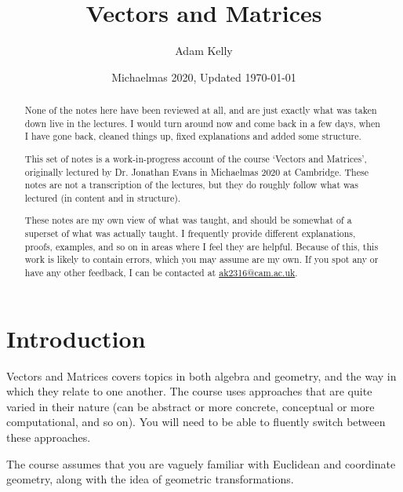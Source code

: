 \documentclass[a4]{scrartcl}
\title{Vectors and Matrices}
\author{Adam Kelly}
\date{Michaelmas 2020, Updated \today}
\begin{document}
\maketitle

\begin{abstract}\vspace{2\baselineskip}
	{\color{red} None of the notes here have been reviewed at all, and are just exactly what was taken down live in the lectures. I would turn around now and come back in a few days, when I have gone back, cleaned things up, fixed explanations and added some structure.}
	\vspace{5\baselineskip}



	This set of notes is a work-in-progress account of the course `Vectors and Matrices', originally lectured by Dr. Jonathan Evans in Michaelmas 2020 at Cambridge. These notes are not a transcription of the lectures, but they do roughly follow what was lectured (in content and in structure).

	These notes are my own view of what was taught, and should be somewhat of a superset of what was actually taught. I frequently provide different explanations, proofs, examples, and so on in areas where I feel they are helpful. Because of this, this work is likely to contain errors, which you may assume are my own. If you spot any or have any other feedback, I can be contacted at \href{mailto:ak2316@cam.ac.uk}{ak2316@cam.ac.uk}.

\end{abstract}

\tableofcontents

\clearpage

\section{Introduction}

Vectors and Matrices covers topics in both algebra and geometry, and the way in which they relate to one another. The course uses approaches that are quite varied in their nature (can be abstract or more concrete, conceptual or more computational, and so on). You will need to be able to fluently switch between these approaches.

The course assumes that you are vaguely familiar with Euclidean and coordinate geometry, along with the idea of geometric transformations.
\end{document}
